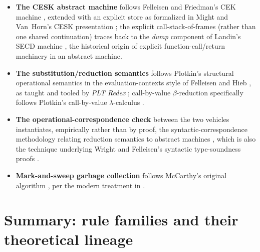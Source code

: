 \documentclass[11pt]{article}
\begin{document}
\begin{itemize}
  \item \textbf{The CESK abstract machine} follows Felleisen and Friedman's
        CEK machine \cite{felleisen1986control}, extended with an explicit
        store as formalized in Might and Van~Horn's CESK presentation
        \cite{mightvanhorn2010aam}; the explicit call-stack-of-frames
        (rather than one shared continuation) traces back to the
        \emph{dump} component of Landin's SECD machine
        \cite{landin1964scpp}, the historical origin of explicit
        function-call/return machinery in an abstract machine.
  \item \textbf{The substitution/reduction semantics} follows Plotkin's
        structural operational semantics \cite{plotkin1981sos} in the
        evaluation-contexts style of Felleisen and Hieb
        \cite{felleisenhieb1992}, as taught and tooled by \emph{PLT Redex}
        \cite{felleisenfindlerflatt2009redex}; call-by-value $\beta$-reduction
        specifically follows Plotkin's call-by-value $\lambda$-calculus
        \cite{plotkin1975callccv}.
  \item \textbf{The operational-correspondence check} between the two
        vehicles instantiates, empirically rather than by proof, the
        syntactic-correspondence methodology relating reduction semantics
        to abstract machines \cite{danvy2004rational,ageefsen2003refocusing},
        which is also the technique underlying Wright and Felleisen's
        syntactic type-soundness proofs \cite{wrightfelleisen1994syntactic}.
  \item \textbf{Mark-and-sweep garbage collection} follows McCarthy's
        original algorithm \cite{mccarthy1960recursive}, per the modern
        treatment in \cite{jgh2011gchandbook}.
\end{itemize}

\section{Summary: rule families and their theoretical lineage}
\end{document}
